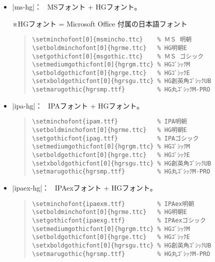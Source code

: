 \documentclass[a4paper,uplatex]{jsarticle}
\newcommand{\Note}{\par\noindent ※}
\newcommand{\Means}{：\ }
\begin{document}
\begin{itemize}
\item |ms-hg|\Means
  MSフォント + HGフォント。
  \Note HGフォント = Microsoft Office 付属の日本語フォント
\begin{quote}\small\begin{verbatim}
\setminchofont[0]{msmincho.ttc}    % ＭＳ 明朝
\setboldminchofont[0]{hgrme.ttc}   % HG明朝E
\setgothicfont[0]{msgothic.ttc}    % ＭＳ ゴシック
\setmediumgothicfont[0]{hgrgm.ttc} % HGｺﾞｼｯｸM
\setboldgothicfont[0]{hgrge.ttc}   % HGｺﾞｼｯｸE
\setxboldgothicfont[0]{hgrsgu.ttc} % HG創英角ｺﾞｼｯｸUB
\setmarugothic{hgrsmp.ttf}         % HG丸ｺﾞｼｯｸM-PRO 
\end{verbatim}\end{quote}

\item |ipa-hg|\Means
   IPAフォント + HGフォント。
\begin{quote}\small\begin{verbatim}
\setminchofont{ipam.ttf}           % IPA明朝
\setboldminchofont[0]{hgrme.ttc}   % HG明朝E
\setgothicfont{ipag.ttf}           % IPAゴシック
\setmediumgothicfont[0]{hgrgm.ttc} % HGｺﾞｼｯｸM
\setboldgothicfont[0]{hgrge.ttc}   % HGｺﾞｼｯｸE
\setxboldgothicfont[0]{hgrsgu.ttc} % HG創英角ｺﾞｼｯｸUB
\setmarugothic{hgrsmp.ttf}         % HG丸ｺﾞｼｯｸM-PRO 
\end{verbatim}\end{quote}

\item |ipaex-hg|\Means
   IPAexフォント + HGフォント。
\begin{quote}\small\begin{verbatim}
\setminchofont{ipaexm.ttf}         % IPAex明朝
\setboldminchofont[0]{hgrme.ttc}   % HG明朝E
\setgothicfont{ipaexg.ttf}         % IPAexゴシック
\setmediumgothicfont[0]{hgrgm.ttc} % HGｺﾞｼｯｸM
\setboldgothicfont[0]{hgrge.ttc}   % HGｺﾞｼｯｸE
\setxboldgothicfont[0]{hgrsgu.ttc} % HG創英角ｺﾞｼｯｸUB
\setmarugothic{hgrsmp.ttf}         % HG丸ｺﾞｼｯｸM-PRO 
\end{verbatim}\end{quote}


\end{itemize}
\end{document}
